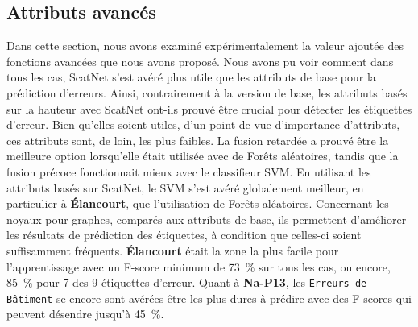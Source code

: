     \subsection*{Attributs avancés}
        Dans cette section, nous avons examiné expérimentalement la valeur ajoutée des fonctions avancées que nous avons proposé.
        Nous avons pu voir comment dans tous les cas, ScatNet s'est avéré plus utile que les attributs de base pour la prédiction d'erreurs.
        Ainsi, contrairement à la version de base, les attributs basés sur la hauteur avec ScatNet ont-ils prouvé être crucial pour détecter les étiquettes d'erreur.
        Bien qu'elles soient utiles, d'un point de vue d'importance d'attributs, ces attributs sont, de loin, les plus faibles.
        La fusion retardée a prouvé être la meilleure option lorsqu'elle était utilisée avec de Forêts aléatoires, tandis que la fusion précoce fonctionnait mieux avec le classifieur SVM.
        En utilisant les attributs basés sur ScatNet, le SVM s'est avéré globalement meilleur, en particulier à \textbf{\'Elancourt}, que l'utilisation de Forêts aléatoires.
        Concernant les noyaux pour graphes, comparés aux attributs de base, ils permettent d'améliorer les résultats de prédiction des étiquettes, à condition que celles-ci soient suffisamment fréquents.
        \textbf{\'Elancourt} était la zone la plus facile pour l'apprentissage avec un F-score minimum de \SI[locale=FR]{73}{\percent} sur tous les cas, ou encore, \SI[locale=FR]{85}{\percent} pour 7 des 9 étiquettes d'erreur.
        Quant à \textbf{Na-P13}, les \texttt{Erreurs de Bâtiment} se encore sont avérées être les plus dures à prédire avec des F-scores qui peuvent désendre jusqu'à \SI[locale=FR]{45}{\percent}.
        

